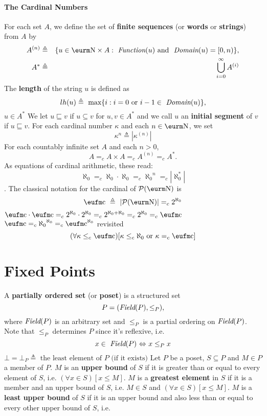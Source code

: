 \documentclass{myproc}
\begin{document}
\paragraph{The Cardinal Numbers}
\bit
\w For each set $A$, we define the set of {\bf{}finite sequences}
	(or {\bf{}words} or {\bf{}strings}) from $A$ by
	\begin{eqnarray*}
	A^{(n)} & \triangleq & \{u \in {\N}\times{A}: 
			\mbox{\ \em{}Function}(u) 
		\mbox{\ and\ }
       \mbox{\ \em{}Domain}(u) = [0, n)\},\\
	A^* & \triangleq & \bigcup_{i=0}^\infty A^{(i)}
	\end{eqnarray*}
	\bit
	\w The {\bf{}length} of the string $u$ is defined as
		\[ lh(u) \triangleq \mbox{\ max}\{i: i = 0 \mbox{\ or\ }
			i -1 \in \mbox{\ \em{}Domain}(u)\}, \]
			$u \in A^*$
	\w We let $u \sqsubseteq v$ if $u \subseteq v$ for $u, v \in A^*$
		and we call $u$ an {\bf{}initial segment} of $v$ if $u \sqsubseteq v$.
	\eit
\w For each cardinal number $\kappa$ and each $n \in {\N}$, we
	set 
		\[ \kappa^n \triangleq |\kappa^{(n)}| \]
\w For each countably infinite set $A$ and each $n > 0$,
	\[ A =_c A\times{A} =_c A^{(n)} =_c A^*. \]
	As equations of cardinal arithmetic, these read:
		\[ \aleph_0 =_c \aleph_0\cdot\aleph_0 =_c
			{\aleph_0}^n =_c |\aleph_0^*| \]
.
	The classical notation for the cardinal of ${\cal{}P}(\N)$ is 
		\[ \c \ \triangleq\ |{\cal{}P}(\N)| =_c 2^{\aleph_0} \]
	\bit
	\w $\c\cdot{\c} =_c 2^{\aleph_0}\cdot{}2^{\aleph_0} =_c
		2^{\aleph_0 + \aleph_0} =_c 2^{\aleph_0} =_c \c$
	\w $\c =_c {\aleph_0}^{\aleph_0} =_c \c^{\aleph_0}$
	 revisited
	\[ (\forall{\kappa \le_c \c})[\kappa \le_c \aleph_0 \mbox{\ or\ }
		\kappa =_c \c]\]
	\eit
\eit

\section{Fixed Points}
\bit
\w A {\bf{}partially ordered set} (or {\bf{}poset}) is a structured
	set \[P = (\mbox{\em{}Field}(P), \le_P),\] where
	$\mbox{\em{}Field}(P)$ is an arbitrary set and $\le_P$ is a partial ordering
	on $\mbox{\em{}Field}(P)$.
	\bit
	\w Note that $\le_P$ determines $P$ since it's reflexive, i.e.
		\[ x \in \mbox{\ \em{}Field}(P) \ \RA \ x \le_P x \]
	\w $\bot = \bot_P \triangleq \mbox{\ the least element of $P$ 
		(if it exists)}$
	\eit
\w Let $P$ be a poset, $S \subseteq P$ and $M \in P$ a member of $P$.
	\ben
	\w $M$ is an {\bf{}upper bound} of $S$ if it is greater than
		or equal to every element of $S$, i.e.
		$(\forall{x \in S})[x \le M]$.
	\w $M$ is a {\bf{}greatest element} in $S$ 
		if it is a member and an upper
		bound of $S$, i.e. $M \in S$ and $(\forall{x \in S})[x \le M]$.
	\w $M$ is a {\bf{}least upper bound} of $S$ if it is an upper
		bound and also less than or 
		equal to every other upper bound of 
		$S$, i.e.
		
\end{document}
